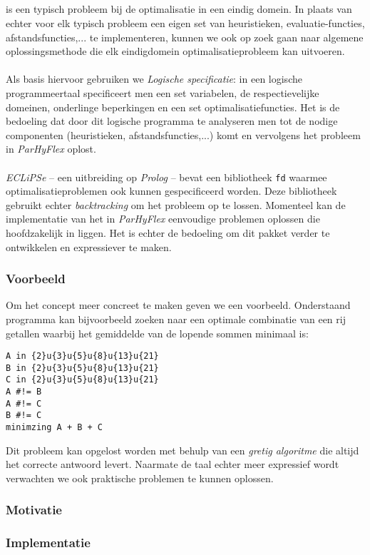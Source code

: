 \subsection{}

 is een typisch probleem bij de optimalisatie in een eindig domein. In plaats van echter voor elk typisch probleem een eigen set van heuristieken, evaluatie-functies, afstandsfuncties,... te implementeren, kunnen we ook op zoek gaan naar algemene oplossingsmethode die elk eindigdomein optimalisatieprobleem kan uitvoeren.

\paragraph{}
Als basis hiervoor gebruiken we \emph{Logische specificatie}: in een logische programmeertaal specificeert men een set variabelen, de respectievelijke domeinen, onderlinge beperkingen en een set optimalisatiefuncties. Het is de bedoeling dat door dit logische programma te analyseren men tot de nodige componenten (heuristieken, afstandsfuncties,...) komt en vervolgens het probleem in \emph{ParHyFlex} oplost.

\paragraph{}
\emph{ECLiPSe} -- een uitbreiding op \emph{Prolog} -- bevat een bibliotheek \texttt{fd} waarmee optimalisatieproblemen ook kunnen gespecificeerd worden. Deze bibliotheek gebruikt echter \emph{backtracking} om het probleem op te lossen. Momenteel kan de implementatie van het  in \emph{ParHyFlex} eenvoudige problemen oplossen die hoofdzakelijk in  liggen. Het is echter de bedoeling om dit pakket verder te ontwikkelen en expressiever te maken.

\subsubsection{Voorbeeld}

Om het concept meer concreet te maken geven we een voorbeeld. Onderstaand programma kan bijvoorbeeld zoeken naar een optimale combinatie van een rij getallen waarbij het gemiddelde van de lopende sommen minimaal is:

\begin{verbatim}
A in {2}u{3}u{5}u{8}u{13}u{21}
B in {2}u{3}u{5}u{8}u{13}u{21}
C in {2}u{3}u{5}u{8}u{13}u{21}
A #!= B
A #!= C
B #!= C
minimzing A + B + C
\end{verbatim}
Dit probleem kan opgelost worden met behulp van een \emph{gretig algoritme} die altijd het correcte antwoord levert. Naarmate de taal echter meer expressief wordt verwachten we ook praktische problemen te kunnen oplossen.

\subsubsection{Motivatie}

\subsubsection{Implementatie}